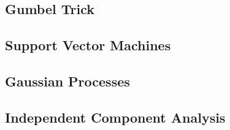 \documentclass[12pt]{article}
\begin{document}
\subsection{Gumbel Trick}

\subsection{Support Vector Machines}

\subsection{Gaussian Processes}

\subsection{Independent Component Analysis}
\end{document}
